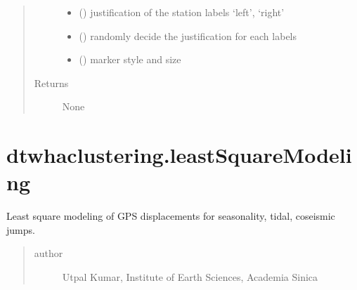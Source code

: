 \documentclass[letterpaper,10pt,english]{sphinxmanual}
\begin{document}
\begin{fulllineitems}
\begin{quote}
\begin{description}
\begin{itemize}
\item {} 
\sphinxAtStartPar
{} () \textendash{} justification of the station labels \sphinxhyphen{} ‘left’, ‘right’

\item {} 
\sphinxAtStartPar
{} () \textendash{} randomly decide the justification for each labels

\item {} 
\sphinxAtStartPar
{} () \textendash{} marker style and size

\end{itemize}

\item[{Returns}] \leavevmode
\sphinxAtStartPar
None

\end{description}\end{quote}

\end{fulllineitems}



\chapter{dtwhaclustering.leastSquareModeling}
\label{\detokenize{modules/leastSquareModeling:module-dtwhaclustering.leastSquareModeling}}\label{\detokenize{modules/leastSquareModeling:dtwhaclustering-leastsquaremodeling}}\label{\detokenize{modules/leastSquareModeling::doc}}
\sphinxAtStartPar
Least square modeling of GPS displacements for seasonality, tidal, co\sphinxhyphen{}seismic jumps.
\begin{quote}\begin{description}
\item[{author}] \leavevmode
\sphinxAtStartPar
Utpal Kumar, Institute of Earth Sciences, Academia Sinica

\end{description}\end{quote}
\end{document}
